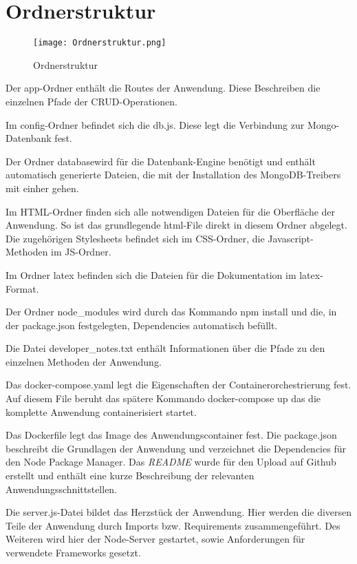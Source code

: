 
\chapter{Ordnerstruktur}
\label{ch:Ordnerstruktur}
\begin{wrapfigure}{r}{.4\textwidth}
\centering
\texttt{[image: Ordnerstruktur.png]}
\vspace{1pt}
\caption{Ordnerstruktur}
\label{fig:Ordnerstruktur}
\end{wrapfigure}

Der app-Ordner enthält die Routes der Anwendung. Diese Beschreiben die einzelnen Pfade der \acs{CRUD}-Operationen.

Im config-Ordner befindet sich die \glqq db.js\grqq{}. Diese legt die Verbindung zur Mongo-Datenbank fest.

Der Ordner \glqq database\grqq{}wird für die Datenbank-Engine benötigt und enthält automatisch generierte Dateien, die mit der Installation des MongoDB-Treibers mit einher gehen.

Im \glqq \acs{HTML}\grqq{}-Ordner finden sich alle notwendigen Dateien für die Oberfläche der Anwendung. So ist das grundlegende html-File direkt in diesem Ordner abgelegt. Die zugehörigen Stylesheets befindet sich im \glqq \acs{CSS}\grqq{}-Ordner, die Javascript-Methoden im \acs{JS}-Ordner.

Im Ordner latex befinden sich die Dateien für die Dokumentation im latex-Format.

Der Ordner node\_modules wird durch das Kommando \glqq  npm install\grqq{} und die, in der package.json festgelegten, Dependencies automatisch befüllt.

Die Datei \glqq  developer\_notes.txt \grqq{} enthält Informationen über die Pfade zu den einzelnen Methoden der Anwendung.

Das \glqq docker-compose.yaml\grqq{} legt die Eigenschaften der Containerorchestrierung fest. Auf diesem File beruht das spätere Kommando \glqq  docker-compose up\grqq{} das die komplette Anwendung containerisiert startet.

Das Dockerfile legt das Image des Anwendungscontainer fest.
Die \glqq package.json\grqq{} beschreibt die Grundlagen der Anwendung und verzeichnet die Dependencies für den Node Package Manager.
Das \textit{README} wurde für den Upload auf Github erstellt und enthält eine kurze Beschreibung der relevanten Anwendungsschnittstellen.

Die \glqq server.js\grqq{}-Datei bildet das Herzstück der Anwendung. Hier werden die diversen Teile der Anwendung durch Imports bzw. Requirements zusammengeführt. Des Weiteren wird hier der Node-Server gestartet, sowie Anforderungen für verwendete Frameworks gesetzt.